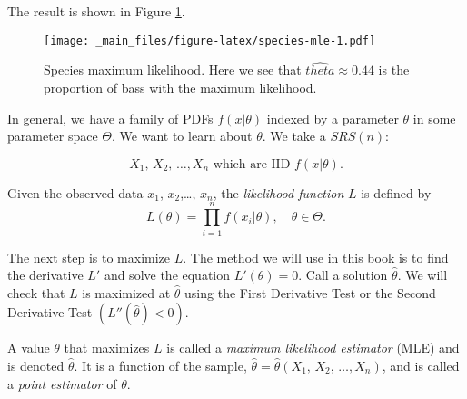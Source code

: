 \documentclass[]{book}
\numberwithin{equation}{chapter}
\numberwithin{figure}{chapter}
\theoremstyle{plain}
\theoremstyle{definition}
\theoremstyle{remark}
\theoremstyle{definition}
\theoremstyle{definition}
\theoremstyle{remark}
\let\BeginKnitrBlock\begin \let\EndKnitrBlock\end
\begin{document}
The result is shown in Figure \ref{fig:species-mle}.

\begin{figure}[htbp]
\centering
\texttt{[image: \_main\_files/figure-latex/species-mle-1.pdf]}
\caption{\label{fig:species-mle}\small Species maximum likelihood. Here we see
that \(\hat{theta} \approx 0.44\) is the proportion of bass with the
maximum likelihood.}
\end{figure}





In general, we have a family of PDFs \(f(x|\theta)\) indexed by a
parameter \(\theta\) in some parameter space \(\Theta\). We want to
learn about \(\theta\). We take a \(SRS(n)\):

\begin{equation}
X_{1},\, X_{2},\,\ldots,X_{n}\mbox{ which are IID \(f(x| \theta )\).}
\end{equation}

\bigskip

\BeginKnitrBlock{definition}
\protect\hypertarget{def:unnamed-chunk-343}{}{\label{def:unnamed-chunk-343}}Given
the observed data \(x_{1}\), \(x_{2}\),\ldots{}, \(x_{n}\), the
\emph{likelihood function} \(L\) is defined by \[
L(\theta)=\prod_{i=1}^{n}f(x_{i}|\theta),\quad \theta\in\Theta.  \]
\EndKnitrBlock{definition}

The next step is to maximize \(L\). The method we will use in this book
is to find the derivative \(L'\) and solve the equation
\(L'(\theta)=0\). Call a solution \(\hat{\theta}\). We will check that
\(L\) is maximized at \(\hat{\theta}\) using the First Derivative Test
or the Second Derivative Test \(\left(L''(\hat{\theta})<0\right)\).

\bigskip

\BeginKnitrBlock{definition}
\protect\hypertarget{def:unnamed-chunk-344}{}{\label{def:unnamed-chunk-344}}A
value \(\theta\) that maximizes \(L\) is called a \emph{maximum
likelihood estimator} (MLE) and is denoted \(\hat{\theta}\). It is a
function of the sample,
\(\hat{\theta}=\hat{\theta}\left(X_{1},\, X_{2},\,\ldots,X_{n}\right)\),
and is called a \emph{point estimator} of \(\theta\).
\EndKnitrBlock{definition}

\bigskip
\end{document}

